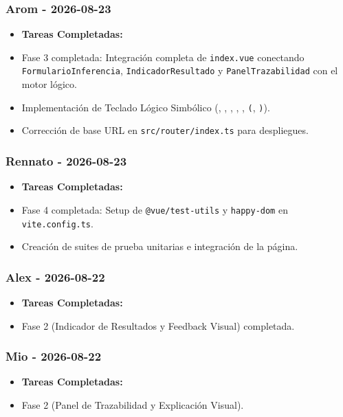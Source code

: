 \documentclass[11pt,a4paper,openany]{book}
\begin{document}
\subsubsection{Arom - 2026-08-23}
\begin{itemize}[leftmargin=*]
\item \textbf{Tareas Completadas:}
\item Fase 3 completada: Integración completa de \texttt{index.vue} conectando \texttt{FormularioInferencia}, \texttt{IndicadorResultado} y \texttt{PanelTrazabilidad} con el motor lógico.
\item Implementación de Teclado Lógico Simbólico (\texttt{}, \texttt{}, \texttt{}, \texttt{}, \texttt{}, \texttt{(}, \texttt{)}).
\item Corrección de base URL en \texttt{src/router/index.ts} para despliegues.
\end{itemize}

\subsubsection{Rennato - 2026-08-23}
\begin{itemize}[leftmargin=*]
\item \textbf{Tareas Completadas:}
\item Fase 4 completada: Setup de \texttt{@vue/test-utils} y \texttt{happy-dom} en \texttt{vite.config.ts}.
\item Creación de suites de prueba unitarias e integración de la página.
\end{itemize}

\subsubsection{Alex - 2026-08-22}
\begin{itemize}[leftmargin=*]
\item \textbf{Tareas Completadas:}
\item Fase 2 (Indicador de Resultados y Feedback Visual) completada.
\end{itemize}

\subsubsection{Mio - 2026-08-22}
\begin{itemize}[leftmargin=*]
\item \textbf{Tareas Completadas:}
\item Fase 2 (Panel de Trazabilidad y Explicación Visual).
\end{itemize}
\end{document}
